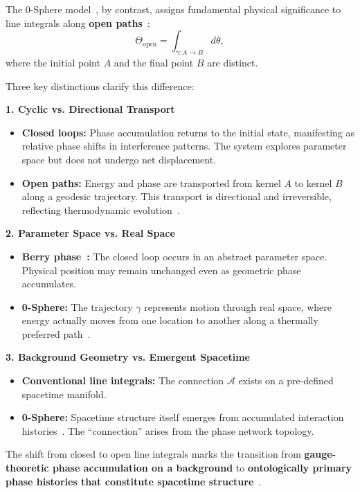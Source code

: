 \documentclass[12pt,letterpaper]{article}
\begin{document}
The 0-Sphere model~\cite{hanamura16759284}, by contrast, assigns fundamental physical significance to line integrals along \textbf{open paths}~\cite{hanamura18203433}:
\begin{equation}
\Theta_{\mathrm{open}} = \int_{\gamma: A \to B} d\theta,
\end{equation}
where the initial point $A$ and the final point $B$ are distinct.

Three key distinctions clarify this difference:

\textbf{1. Cyclic vs. Directional Transport}
\begin{itemize}
\item \textbf{Closed loops:} Phase accumulation returns to the initial state, manifesting as relative phase shifts in interference patterns. The system explores parameter space but does not undergo net displacement.
\item \textbf{Open paths:} Energy and phase are transported from kernel $A$ to kernel $B$ along a geodesic trajectory. This transport is directional and irreversible, reflecting thermodynamic evolution~\cite{hanamura18356895}.
\end{itemize}

\textbf{2. Parameter Space vs. Real Space}
\begin{itemize}
\item \textbf{Berry phase~\cite{Berry1984}:} The closed loop occurs in an abstract parameter space. Physical position may remain unchanged even as geometric phase accumulates.
\item \textbf{0-Sphere:} The trajectory $\gamma$ represents motion through real space, where energy actually moves from one location to another along a thermally preferred path~\cite{hanamura18356895}.
\end{itemize}

\textbf{3. Background Geometry vs. Emergent Spacetime}
\begin{itemize}
\item \textbf{Conventional line integrals:} The connection $\mathcal{A}$ exists on a pre-defined spacetime manifold.
\item \textbf{0-Sphere:} Spacetime structure itself emerges from accumulated interaction histories~\cite{hanamura18135855}. The ``connection'' arises from the phase network topology.
\end{itemize}

The shift from closed to open line integrals marks the transition from \textbf{gauge-theoretic phase accumulation on a background} to \textbf{ontologically primary phase histories that constitute spacetime structure}~\cite{hanamura18203433}.
\end{document}
